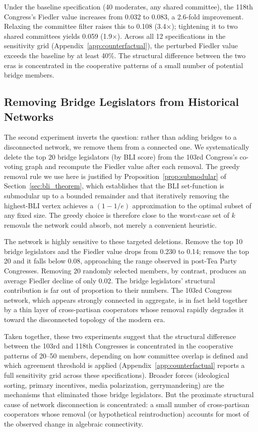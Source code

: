 \documentclass[12pt, a4paper]{article}
\begin{document}
Under the baseline specification (40 moderates, any shared committee), the 118th Congress's Fiedler value increases from 0.032 to 0.083, a 2.6-fold improvement. Relaxing the committee filter raises this to 0.108 (3.4$\times$); tightening it to two shared committees yields 0.059 (1.9$\times$). Across all 12 specifications in the sensitivity grid (Appendix~\ref{app:counterfactual}), the perturbed Fiedler value exceeds the baseline by at least 40\%. The structural difference between the two eras is concentrated in the cooperative patterns of a small number of potential bridge members.

\subsection{Removing Bridge Legislators from Historical Networks}

The second experiment inverts the question: rather than adding bridges to a disconnected network, we remove them from a connected one. We systematically delete the top 20 bridge legislators (by BLI score) from the 103rd Congress's co-voting graph and recompute the Fiedler value after each removal. The greedy removal rule we use here is justified by Proposition~\ref{prop:submodular} of Section~\ref{sec:bli_theorem}, which establishes that the BLI set-function is submodular up to a bounded remainder and that iteratively removing the highest-BLI vertex achieves a $(1 - 1/e)$ approximation to the optimal subset of any fixed size. The greedy choice is therefore close to the worst-case set of $k$ removals the network could absorb, not merely a convenient heuristic.

The network is highly sensitive to these targeted deletions. Remove the top 10 bridge legislators and the Fiedler value drops from 0.230 to 0.14; remove the top 20 and it falls below 0.08, approaching the range observed in post-Tea Party Congresses. Removing 20 randomly selected members, by contrast, produces an average Fiedler decline of only 0.02. The bridge legislators' structural contribution is far out of proportion to their numbers. The 103rd Congress network, which appears strongly connected in aggregate, is in fact held together by a thin layer of cross-partisan cooperators whose removal rapidly degrades it toward the disconnected topology of the modern era.

Taken together, these two experiments suggest that the structural difference between the 103rd and 118th Congresses is concentrated in the cooperative patterns of 20--50 members, depending on how committee overlap is defined and which agreement threshold is applied (Appendix~\ref{app:counterfactual} reports a full sensitivity grid across these specifications). Broader forces (ideological sorting, primary incentives, media polarization, gerrymandering) are the mechanisms that eliminated those bridge legislators. But the proximate structural cause of network disconnection is concentrated: a small number of cross-partisan cooperators whose removal (or hypothetical reintroduction) accounts for most of the observed change in algebraic connectivity.
\end{document}
